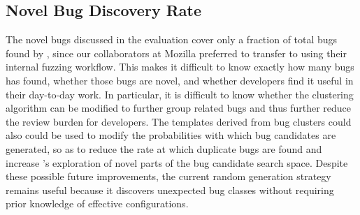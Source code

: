 \subsection{Novel Bug Discovery Rate}

The novel bugs discussed in the evaluation
  cover only a fraction of total bugs found by \toolname,
  since our collaborators at Mozilla preferred
  to transfer \toolname to using their internal fuzzing workflow.
This makes it difficult to know
  exactly how many bugs \toolname has found,
  whether those bugs are novel,
  and whether developers find it useful in their day-to-day work.
In particular, it is difficult to know
  whether the clustering algorithm
  can be modified to further group related bugs
  and thus further reduce the review burden for developers.
The templates derived from bug clusters could also
  could be used to modify the probabilities with which
  bug candidates are generated,
  so as to reduce the rate at which duplicate bugs are found
  and increase \toolname's exploration of novel parts
  of the bug candidate search space.
Despite these possible future improvements,
  the current random generation strategy remains useful
  because it discovers unexpected bug classes
  without requiring prior knowledge of effective configurations.
